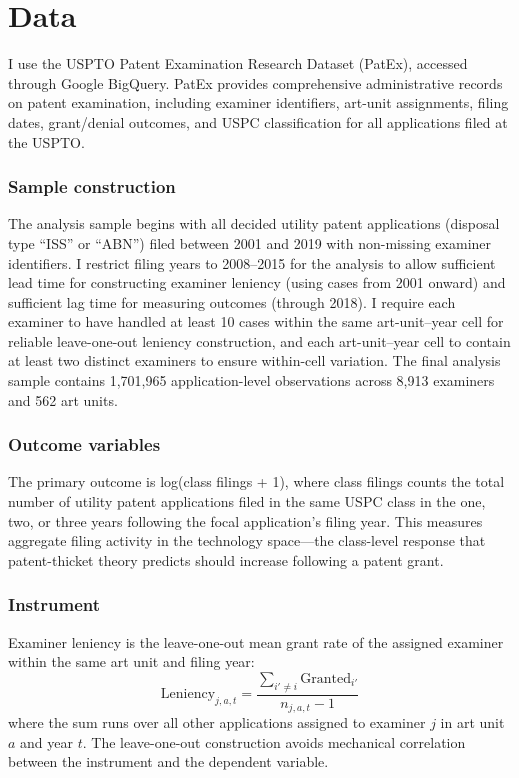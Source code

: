 \documentclass[12pt]{article}
\begin{document}
\section{Data}

I use the USPTO Patent Examination Research Dataset (PatEx), accessed through Google BigQuery. PatEx provides comprehensive administrative records on patent examination, including examiner identifiers, art-unit assignments, filing dates, grant/denial outcomes, and USPC classification for all applications filed at the USPTO.

\subsubsection*{Sample construction} The analysis sample begins with all decided utility patent applications (disposal type ``ISS'' or ``ABN'') filed between 2001 and 2019 with non-missing examiner identifiers. I restrict filing years to 2008--2015 for the analysis to allow sufficient lead time for constructing examiner leniency (using cases from 2001 onward) and sufficient lag time for measuring outcomes (through 2018). I require each examiner to have handled at least 10 cases within the same art-unit--year cell for reliable leave-one-out leniency construction, and each art-unit--year cell to contain at least two distinct examiners to ensure within-cell variation. The final analysis sample contains 1,701,965 application-level observations across 8,913 examiners and 562 art units.

\subsubsection*{Outcome variables} The primary outcome is log(class filings + 1), where class filings counts the total number of utility patent applications filed in the same USPC class in the one, two, or three years following the focal application's filing year. This measures aggregate filing activity in the technology space---the class-level response that patent-thicket theory predicts should increase following a patent grant.

\subsubsection*{Instrument} Examiner leniency is the leave-one-out mean grant rate of the assigned examiner within the same art unit and filing year:
\begin{equation}
\text{Leniency}_{j,a,t} = \frac{\sum_{i' \neq i} \text{Granted}_{i'}}{n_{j,a,t} - 1}
\end{equation}
where the sum runs over all other applications assigned to examiner $j$ in art unit $a$ and year $t$. The leave-one-out construction avoids mechanical correlation between the instrument and the dependent variable.
\end{document}
